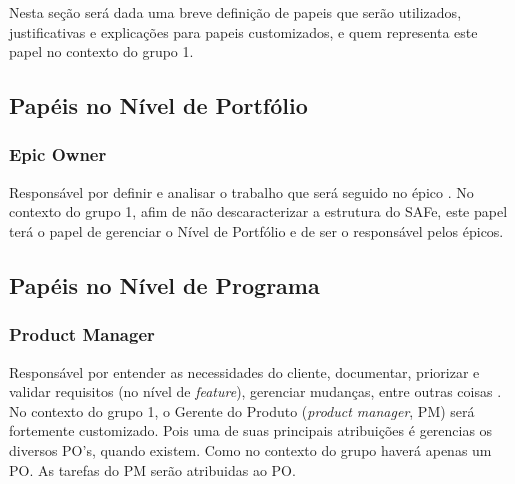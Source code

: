 Nesta seção será dada uma breve definição de papeis que serão utilizados, justificativas e explicações para papeis customizados, e quem representa este papel no contexto do grupo 1.

\subsection{Papéis no Nível de Portfólio}
\subsubsection{Epic Owner}
Responsável por definir e analisar o trabalho que será seguido no épico \cite[p. 418-419]{safe001}. No contexto do grupo 1, afim de não descaracterizar a estrutura do SAFe, este papel terá o papel de gerenciar o Nível de Portfólio e de ser o responsável pelos épicos.


\subsection{Papéis no Nível de Programa}

\subsubsection{Product Manager}
Responsável por entender as necessidades do cliente, documentar, priorizar e validar requisitos (no nível de \emph{feature}), gerenciar mudanças, entre outras coisas \cite[p. 283-287]{safe001}. No contexto do grupo 1, o Gerente do Produto (\emph{product manager}, PM) será fortemente customizado. Pois uma de suas principais atribuições é gerencias os diversos PO's, quando existem. Como no contexto do grupo haverá apenas um PO. As tarefas do PM serão atribuidas ao PO. %

